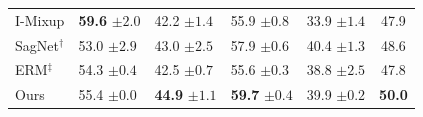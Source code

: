 \begin{table}[H]
\begin{tabular}{lllll|c}
I-Mixup & \textbf{59.6} \scriptsize$\pm2.0$ & 42.2 \scriptsize$\pm1.4$ & 55.9 \scriptsize$\pm0.8$ & 33.9 \scriptsize$\pm1.4$ & 47.9 \\
SagNet$^\dagger$ & 53.0 \scriptsize$\pm2.9$ & 43.0 \scriptsize$\pm2.5$ & 57.9 \scriptsize$\pm0.6$ & 40.4 \scriptsize$\pm1.3$ & 48.6 \\
ERM$^\ddagger$ & 54.3 \scriptsize$\pm0.4$ & 42.5 \scriptsize$\pm0.7$ & 55.6 \scriptsize$\pm0.3$ & 38.8 \scriptsize$\pm2.5$ & 47.8 \\
\midrule
Ours & 55.4 \scriptsize$\pm0.0$ & \textbf{44.9} \scriptsize$\pm1.1$ & \textbf{59.7} \scriptsize$\pm0.4$ & 39.9 \scriptsize$\pm0.2$ & \textbf{50.0} \\
\bottomrule
\end{tabular}
\end{table}